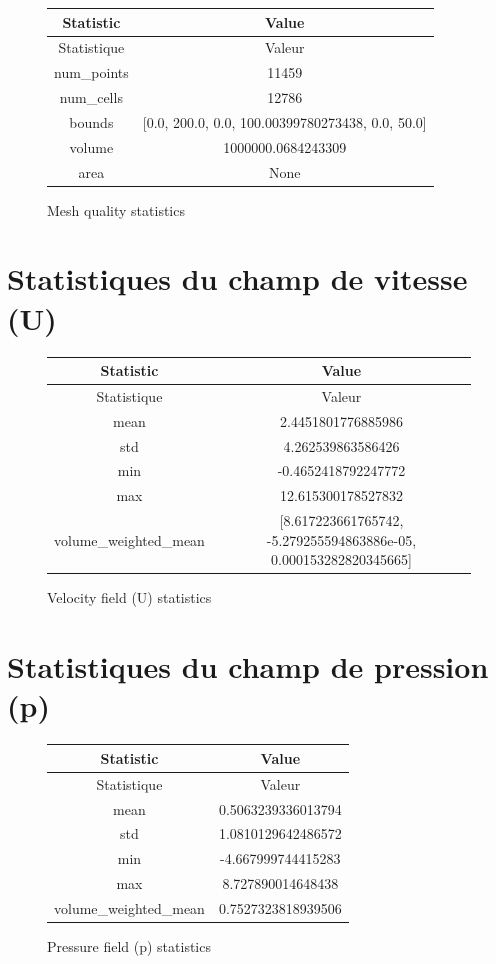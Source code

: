\documentclass{article}%
\begin{document}
\begin{figure}[h!]%
\begin{tabular}{|c|c|}%
\hline%
Statistic&Value\\%
\hline%
Statistique&Valeur\\%
\hline%
num\_points&11459\\%
\hline%
num\_cells&12786\\%
\hline%
bounds&{[}0.0, 200.0, 0.0, 100.00399780273438, 0.0, 50.0{]}\\%
\hline%
volume&1000000.0684243309\\%
\hline%
area&None\\%
\hline%
\end{tabular}%
\caption{Mesh quality statistics}%
\end{figure}

%
\section{Statistiques du champ de vitesse (U)}%
\label{sec:Statistiquesduchampdevitesse(U)}%

%


\begin{figure}[h!]%
\begin{tabular}{|c|c|}%
\hline%
Statistic&Value\\%
\hline%
Statistique&Valeur\\%
\hline%
mean&2.4451801776885986\\%
\hline%
std&4.262539863586426\\%
\hline%
min&{-}0.4652418792247772\\%
\hline%
max&12.615300178527832\\%
\hline%
volume\_weighted\_mean&{[}8.617223661765742, {-}5.279255594863886e{-}05, 0.000153282820345665{]}\\%
\hline%
\end{tabular}%
\caption{Velocity field (U) statistics}%
\end{figure}

%
\section{Statistiques du champ de pression (p)}%
\label{sec:Statistiquesduchampdepression(p)}%

%


\begin{figure}[h!]%
\begin{tabular}{|c|c|}%
\hline%
Statistic&Value\\%
\hline%
Statistique&Valeur\\%
\hline%
mean&0.5063239336013794\\%
\hline%
std&1.0810129642486572\\%
\hline%
min&{-}4.667999744415283\\%
\hline%
max&8.727890014648438\\%
\hline%
volume\_weighted\_mean&0.7527323818939506\\%
\hline%
\end{tabular}%
\caption{Pressure field (p) statistics}%
\end{figure}
\end{document}
